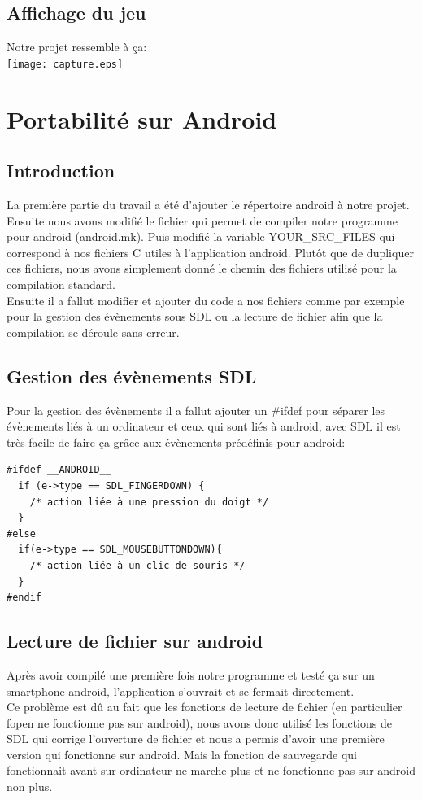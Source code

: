 \documentclass[12pt]{report}
\begin{document}
\section{Affichage du jeu}
Notre projet ressemble à ça:\\

\texttt{[image: capture.eps]}



\chapter{Portabilité sur Android}
\section{Introduction}
\textnormal{La première partie du travail a été d'ajouter le répertoire android à notre projet. Ensuite nous avons modifié le fichier qui permet de compiler notre programme pour android (android.mk). Puis modifié la variable YOUR\_SRC\_FILES qui correspond à nos fichiers C utiles à l'application android. Plutôt que de dupliquer ces fichiers, nous avons simplement donné le chemin des fichiers utilisé pour la compilation standard.\\Ensuite il a fallut modifier et ajouter du code a nos fichiers comme par exemple pour la gestion des évènements sous SDL ou la lecture de fichier afin que la compilation se déroule sans erreur.}

\newpage

\section{Gestion des évènements SDL}
\textnormal{Pour la gestion des évènements il a fallut ajouter un \#ifdef pour séparer les évènements liés à un ordinateur et ceux qui sont liés à android, avec SDL il est très facile de faire ça grâce aux évènements prédéfinis pour android:}
\begin{verbatim}
#ifdef __ANDROID__
  if (e->type == SDL_FINGERDOWN) {
    /* action liée à une pression du doigt */
  }
#else
  if(e->type == SDL_MOUSEBUTTONDOWN){
    /* action liée à un clic de souris */
  }
#endif
\end{verbatim}
\section{Lecture de fichier sur android}
\textnormal{Après avoir compilé une première fois notre programme et testé ça sur un smartphone android, l'application s'ouvrait et se fermait directement.\\Ce problème est dû au fait que les fonctions de lecture de fichier (en particulier fopen ne fonctionne pas sur android), nous avons donc utilisé les fonctions de SDL qui corrige l'ouverture de fichier et nous a permis d'avoir une première version qui fonctionne sur android. Mais la fonction de sauvegarde qui fonctionnait avant sur ordinateur ne marche plus et ne fonctionne pas sur android non plus.}
\end{document}

